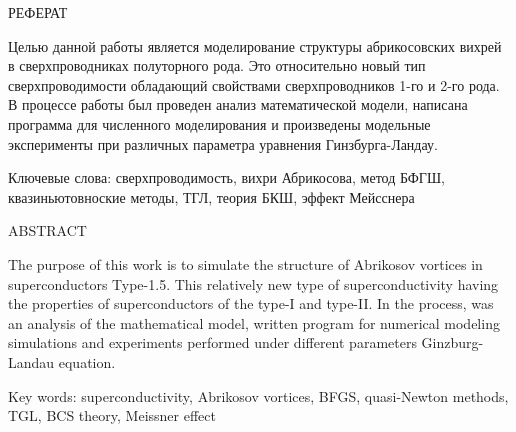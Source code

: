 \begin{center}
	РЕФЕРАТ
\end{center}

Целью данной работы является моделирование структуры абрикосовских вихрей в 
сверхпроводниках полуторного рода. Это относительно новый тип сверхпроводимости 
обладающий свойствами сверхпроводников 1-го и 2-го рода. В процессе работы был 
проведен анализ математической модели, написана программа для численного 
моделирования и произведены модельные эксперименты при различных параметра 
уравнения Гинзбурга-Ландау.
\vspace*{1cm}

\noindent Ключевые слова: сверхпроводимость, вихри Абрикосова, метод БФГШ, 
квазиньютовноские методы, ТГЛ, теория БКШ, эффект Мейсснера
\vspace*{1cm}

\begin{center}
    ABSTRACT
\end{center}

The purpose of this work is to simulate the structure of Abrikosov vortices in
superconductors Type-1.5. This relatively new type of superconductivity
having the properties of superconductors of the type-I and type-II. In the 
process, was an analysis of the mathematical model, written program for 
numerical modeling simulations and experiments performed under different 
parameters Ginzburg-Landau equation.

\vspace*{1cm}

\noindent Key words: superconductivity, Abrikosov vortices, BFGS, quasi-Newton 
methods, TGL, BCS theory, Meissner effect

\newpage